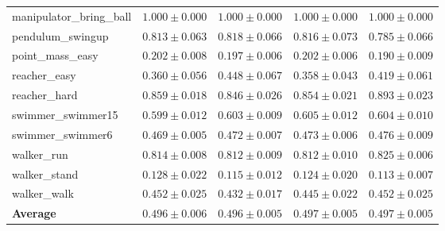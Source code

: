 \begin{tabular}{lrrrr}
  manipulator\_bring\_ball & $1.000\pm0.000$ & $1.000\pm0.000$ & $1.000\pm0.000$ & $1.000\pm0.000$ \\
  pendulum\_swingup & $0.813\pm0.063$ & $0.818\pm0.066$ & $0.816\pm0.073$ & $0.785\pm0.066$ \\
  point\_mass\_easy & $0.202\pm0.008$ & $0.197\pm0.006$ & $0.202\pm0.006$ & $\mathbf{0.190\pm0.009}$ \\
  reacher\_easy & $0.360\pm0.056$ & $0.448\pm0.067$ & $0.358\pm0.043$ & $0.419\pm0.061$ \\
  reacher\_hard & $0.859\pm0.018$ & $0.846\pm0.026$ & $0.854\pm0.021$ & $0.893\pm0.023$ \\
  swimmer\_swimmer15 & $0.599\pm0.012$ & $0.603\pm0.009$ & $0.605\pm0.012$ & $0.604\pm0.010$ \\
  swimmer\_swimmer6 & $0.469\pm0.005$ & $0.472\pm0.007$ & $0.473\pm0.006$ & $0.476\pm0.009$ \\
  walker\_run & $0.814\pm0.008$ & $0.812\pm0.009$ & $0.812\pm0.010$ & $0.825\pm0.006$ \\
  walker\_stand & $0.128\pm0.022$ & $0.115\pm0.012$ & $0.124\pm0.020$ & $0.113\pm0.007$ \\
  walker\_walk & $0.452\pm0.025$ & $0.432\pm0.017$ & $0.445\pm0.022$ & $0.452\pm0.025$ \\
  \midrule
  \textbf{Average} & $0.496\pm0.006$ & $0.496\pm0.005$ & $0.497\pm0.005$ & $0.497\pm0.005$ \\
  \bottomrule
\end{tabular}
